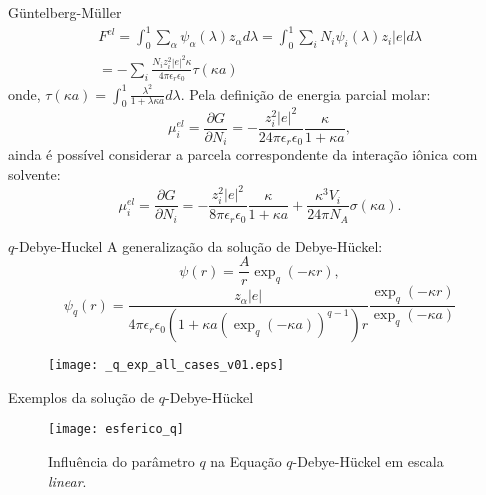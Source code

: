 \documentclass{beamer}
\begin{document}
\begin{frame}{G\"{u}ntelberg-M\"{u}ller}
	\begin{eqnarray}
		F^{el} = \int_{0}^{1} \sum_{\alpha}\psi_{\alpha}(\lambda)z_{\alpha}d\lambda = 
		\int_{0}^{1} \sum_{i} N_i\psi_{i}(\lambda)z_{i}|e|d\lambda \\\nonumber
		= -\sum_{i} \frac{N_{i}z_{i}^{2}|e|^2\kappa}{4\pi \epsilon_r \epsilon_0 }\tau(\kappa a) 
	\end{eqnarray}
	onde, $\tau(\kappa a) = \int_{0}^{1}\frac{\lambda^2}{1+\lambda \kappa a} d \lambda $.
Pela definição de energia parcial molar: 
	\begin{equation}
		\mu^{el}_{i} = \frac{\partial G }{\partial N_i} =
		-\frac{z_i^2 |e|^2 }{2 4\pi \epsilon_r \epsilon_0 }\frac{\kappa }{1+\kappa a},
	\end{equation}
ainda é possível considerar a parcela correspondente da interação iônica com solvente:
	\begin{equation}
		\mu^{el}_{i} = \frac{\partial G }{\partial N_i} =
		-\frac{z_i^2 |e|^2 }{8\pi \epsilon_r \epsilon_0 }\frac{\kappa }{1+\kappa a}
		+\frac{\kappa^3V_i}{24 \pi N_A }\sigma(\kappa a) .
	\end{equation}
\end{frame}


\begin{frame}{$q$-Debye-Huckel}
	A generalização da solução de Debye-H\"{u}ckel:
\begin{equation}
	\label{eq:sph}
	\psi(r) = \frac{A}{r}\exp_q(-\kappa r), 
\end{equation}
	\begin{equation}
		\psi_q(r) = \frac{z_{\alpha}|e|}{4\pi \epsilon_r \epsilon_0 (1+\kappa a( \exp_q(-\kappa a))^{q-1})r}\frac{\exp_q(-\kappa r)}{\exp_q(-\kappa a)} 
        \end{equation}
	\begin{figure}
         \texttt{[image: \_q\_exp\_all\_cases\_v01.eps]}
	\end{figure}

\end{frame}

\begin{frame}{Exemplos da solução de $q$-Debye-H\"{u}ckel}
\begin{figure}
\centering
  \texttt{[image: esferico\_q]}
	\caption{Influência do parâmetro $q$ na Equação $q$-Debye-H\"{u}ckel em escala {\it linear}.}
\end{figure}
\end{frame}
\end{document}
